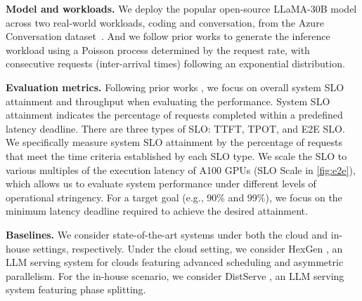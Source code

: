 \noindent \textbf{Model and workloads.} We deploy the popular open-source LLaMA-30B model across two real-world workloads, coding and conversation, from the Azure Conversation dataset~\cite{patel2023splitwise}.
And we follow prior works \cite{li2023alpaserve,jiang2024hexgen} to generate the inference workload using a Poisson process determined by the request rate, with consecutive requests (inter-arrival times) following an exponential distribution.


\noindent \textbf{Evaluation metrics.} Following prior works \cite{patel2023splitwise,zhong2024distserve}, we focus on overall system SLO attainment and throughput when evaluating the performance. System SLO attainment indicates the percentage of requests completed within a predefined latency deadline. There are three types of SLO: TTFT, TPOT, and E2E SLO. We specifically measure system SLO attainment by the percentage of requests that meet the time criteria established by each SLO type. We scale the SLO to various multiples of the execution latency of A100 GPUs (SLO Scale in \autoref{fig:e2e}), which allows us to evaluate system performance under different levels of operational stringency. For a target  goal (e.g., 90\% and 99\%), we focus on the minimum latency deadline required to achieve the desired attainment.

% 


\noindent \textbf{Baselines.} 
We consider state-of-the-art systems under both the cloud and in-house settings, respectively. Under the cloud setting, we consider HexGen \cite{jiang2024hexgen}, an LLM serving system for clouds featuring advanced scheduling and asymmetric parallelism. For the in-house scenario, we consider  DistServe \cite{zhong2024distserve}, an LLM serving system featuring phase splitting. 

